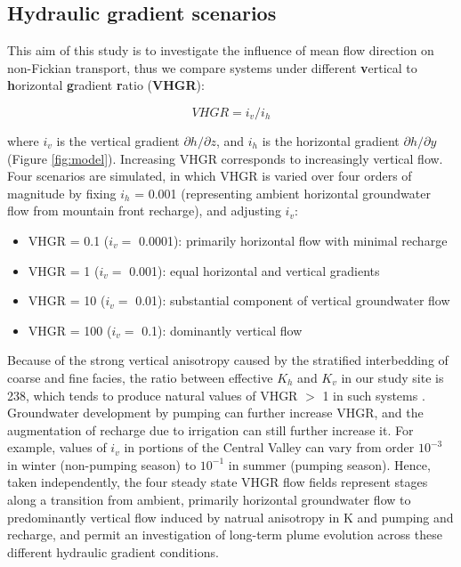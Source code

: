 


\subsection{Hydraulic gradient scenarios}
\label{ss_2_3}

This aim of this study is to investigate the influence of mean flow direction on non-Fickian transport, thus we compare systems under different \textbf{v}ertical to \textbf{h}orizontal \textbf{g}radient \textbf{r}atio (\textbf{VHGR}):

\begin{equation}
    VHGR = i_v / i_h
\label{eq:vhgr}
\end{equation}

where $i_v$ is the vertical gradient $\partial{h}/\partial{z}$, and $i_h$ is the horizontal gradient $\partial{h}/\partial{y}$ (Figure \ref{fig:model}). Increasing VHGR corresponds to increasingly vertical flow. Four scenarios are simulated, in which VHGR is varied over four orders of magnitude by fixing $i_h$ = 0.001 (representing ambient horizontal groundwater flow from mountain front recharge), and adjusting $i_v$:

\begin{itemize}
    \item VHGR = 0.1 ($i_v =$ 0.0001): primarily horizontal flow with minimal recharge
    \item VHGR = 1 ($i_v =$ 0.001): equal horizontal and vertical gradients  
    \item VHGR = 10 ($i_v =$ 0.01): substantial component of vertical groundwater flow
    \item VHGR = 100 ($i_v =$ 0.1): dominantly vertical flow 
\end{itemize}

Because of the strong vertical anisotropy caused by the stratified interbedding of coarse and fine facies, the ratio between effective $K_h$ and $K_v$ in our study site is 238, which tends to produce natural values of VHGR $>$ 1 in such systems \citep[e.g.][]{fogg1986groundwater}. Groundwater development by pumping can further increase VHGR, and the augmentation of recharge due to irrigation can still further increase it. For example, values of $i_v$ in portions of the Central Valley can vary from order $10^{-3}$ in winter (non-pumping season) to $10^{-1}$ in summer (pumping season). Hence, taken independently, the four steady state VHGR flow fields represent stages along a transition from ambient, primarily horizontal groundwater flow to predominantly vertical flow induced by natrual anisotropy in K and pumping and recharge, and permit an investigation of long-term plume evolution across these different hydraulic gradient conditions. 


